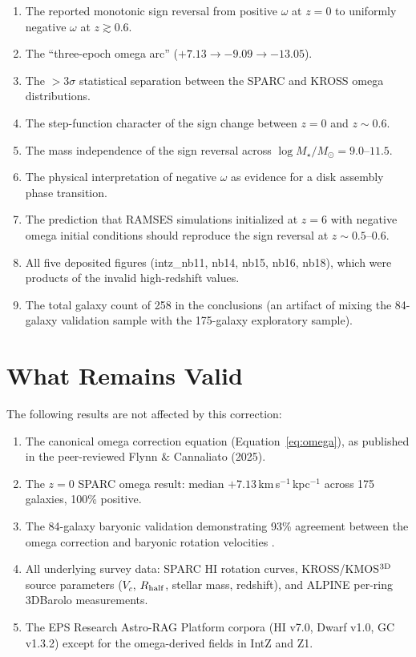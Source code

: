 \documentclass[a4paper,12pt]{article}
\newcommand{\om}{\omega}
\newcommand{\omunit}{km\,s$^{-1}$\,kpc$^{-1}$}
\begin{document}
\begin{enumerate}
  \item The reported monotonic sign reversal from positive $\om$ at
        $z=0$ to uniformly negative $\om$ at $z\gtrsim0.6$.
  \item The ``three-epoch omega arc'' ($+7.13 \to -9.09 \to -13.05$).
  \item The $>3\sigma$ statistical separation between the SPARC and
        KROSS omega distributions.
  \item The step-function character of the sign change between
        $z=0$ and $z\sim0.6$.
  \item The mass independence of the sign reversal across
        $\log M_\star/M_\odot = 9.0$--$11.5$.
  \item The physical interpretation of negative $\om$ as evidence
        for a disk assembly phase transition.
  \item The prediction that RAMSES simulations initialized at $z=6$
        with negative omega initial conditions should reproduce the
        sign reversal at $z\sim0.5$--$0.6$.
  \item All five deposited figures
        (intz\_nb11, nb14, nb15, nb16, nb18), which were products
        of the invalid high-redshift values.
  \item The total galaxy count of 258 in the conclusions (an artifact
        of mixing the 84-galaxy validation sample with the 175-galaxy
        exploratory sample).
\end{enumerate}

\section{What Remains Valid}
\label{sec:valid}

The following results are not affected by this correction:

\begin{enumerate}
  \item The canonical omega correction equation
        (Equation~\ref{eq:omega}), as published in the peer-reviewed
        Flynn \& Cannaliato (2025).
  \item The $z=0$ SPARC omega result: median $+7.13$\,\omunit{}
        across 175 galaxies, 100\% positive.
  \item The 84-galaxy baryonic validation demonstrating 93\% agreement
        between the omega correction and baryonic rotation velocities
        \citep{flynn2026baryonic}.
  \item All underlying survey data: SPARC HI rotation curves,
        KROSS/KMOS$^{\rm 3D}$ source parameters ($V_c$, $R_{\rm half}$,
        stellar mass, redshift), and ALPINE per-ring 3DBarolo
        measurements.
  \item The EPS Research Astro-RAG Platform corpora (HI v7.0, Dwarf v1.0,
        GC v1.3.2) except for the omega-derived fields in IntZ and Z1.
\end{enumerate}
\end{document}
